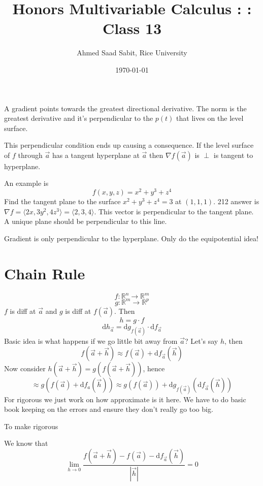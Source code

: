 \documentclass[letter]{article}
\title{Honors Multivariable Calculus : : Class 13}
\author{Ahmed Saad Sabit, Rice University}
\date{\today}
\begin{document}
\maketitle
A gradient points towards the greatest directional derivative. The norm is the greatest derivative and it's perpendicular to the $p(t)$ that lives on the level surface. 

This perpendicular condition ends up causing a consequence. If the level surface of $f$ through $\vec{a}$ has a tangent hyperplane at $\vec{a}$ then $\nabla f(\vec{a})$ is $\perp$ is tangent to hyperplane. 

An example is 
 \[
 f(x,y,z) = x^2 + y^3 + z^{4}
 \] Find the tangent plane to the surface $x^2 + y^3 + z^{4} = 3$ at $(1,1,1)$. 212 answer is $ \nabla f = \langle 2x, 3y^2, 4z^3 \rangle = \langle 2,3,4 \rangle$. This vector is perpendicular to the tangent plane. A unique plane should be perpendicular to this line. 

 Gradient is only perpendicular to the hyperplane. Only do the equipotential idea! 

 \section{Chain Rule}
 \[
 f:\mathbb{R}^{n} \to \mathbb{R}^{m}
 \] 
 \[
 g : \mathbb{R}^{m} \to \mathbb{R}^{p}
 \] 
 $f$ is diff at $\vec{a}$ and $g$ is diff at $f(\vec{a})$. Then 
 \[
 h = g \cdot  f
 \]
\[
\boxed{
	\mathrm{d} h _{\vec{a}} = \mathrm{d} g_{f(\vec{a})} \cdot  \mathrm{d} f_{\vec{a}}
}
\] 
Basic idea is what happens if we go little bit away from $\vec{a}$? Let's say $h$, then 
\[
	f(\vec{a}+ \vec{h})  \approx f(\vec{a}) + \mathrm{d} f_{\vec{a}} (\vec{h})
\] 
Now consider $h(\vec{a} + \vec{h} ) = g(f(\vec{a} + \vec{h}))$, hence 
\[
	\approx g(
	f(\vec{a}) + \mathrm{d} f_a (\vec{h}) ) \approx 
	g(f(\vec{a})) + 
	\mathrm{d} g_{f(\vec{a}) } ( \mathrm{d} f_{\vec{a}} (\vec{h}))
\]
For rigorous we just work on how approximate is it here. We have to do basic book keeping on the errors and ensure they don't really go too big.  

To make rigorous 

We know that  
\[
\lim_{h \to 0}  
\frac{
	f(\vec{a}+\vec{h}) - f(\vec{a}) - \mathrm{d} f_{\vec{a}} (\vec{h}) 
}{ |\vec{h}| } = 0
\]  
\end{document}
